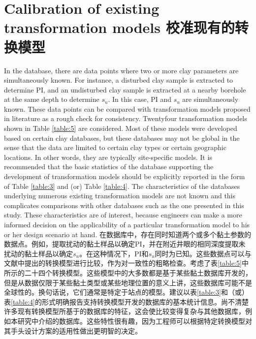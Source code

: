 \section*{Calibration of existing transformation models 校准现有的转换模型}

\begin{Parallel}{0.60\textwidth}{}
    \ParallelLText
    {
        In the database, there are data points where two or more clay parameters are simultaneously known. For instance, a disturbed clay sample is extracted to determine PI, and an undisturbed clay sample is extracted at a nearby borehole at the same depth to determine $s_u$. In this case, PI and $s_u$ are simultaneously known. These data points can be compared with transformation models proposed in literature as a rough check for consistency. Twentyfour transformation models shown in Table \ref{table:5} are considered. Most of these models were developed based on certain clay databases, but these databases may not be global in the sense that the data are limited to certain clay types or certain geographic locations. In other words, they are typically site-specific models. It is recommended that the basic statistics of the database supporting the development of transformation models should be explicitly reported in the form of Table \ref{table:3} and (or) Table \ref{table:4}. The characteristics of the databases underlying numerous existing transformation models are not known and this complicates comparisons with other databases such as the one presented in this study. These characteristics are of interest, because engineers can make a more informed decision on the applicability of a particular transformation model to his or her design scenario at hand.
    }
    \ParallelRText
    {
        在数据库中，存在同时知道两个或多个黏土参数的数据点。例如，提取扰动的黏土样品以确定PI，并在附近井眼的相同深度提取未扰动的黏土样品以确定$s_u$。在这种情况下，PI和$s_u$同时为已知。这些数据点可以与文献中提出的转换模型进行比较，作为对一致性的粗略检查。考虑了表\ref{table:5}中所示的二十四个转换模型。这些模型中的大多数都是基于某些黏土数据库开发的，但是从数据仅限于某些黏土类型或某些地理位置的意义上讲，这些数据库可能不是全球性的。换句话说，它们通常是特定于站点的模型。建议以表\ref{table:3}和（或）表\ref{table:4}的形式明确报告支持转换模型开发的数据库的基本统计信息。尚不清楚许多现有转换模型所基于的数据库的特征，这会使比较变得复杂与其他数据库，例如本研究中介绍的数据库。这些特性很有趣，因为工程师可以根据特定转换模型对其手头设计方案的适用性做出更明智的决定。
    }
    \ParallelPar
    
    \ParallelLText

\end{Parallel}

